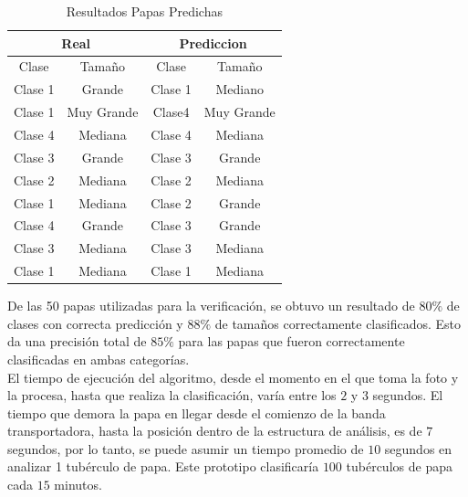 \begin{table}[ht]
	\centering
	\begin{tabular}{|cc|cc|}
		\hline
		\multicolumn{2}{|c|}{Real}                 & \multicolumn{2}{c|}{Prediccion}           \\ \hline
		\multicolumn{1}{|c|}{Clase}   & Tamaño     & \multicolumn{1}{c|}{Clase}   & Tamaño     \\ \hline
		\multicolumn{1}{|c|}{Clase 1} & Grande     & \multicolumn{1}{c|}{Clase 1} & Mediano    \\ \hline
		\multicolumn{1}{|c|}{Clase 1} & Muy Grande & \multicolumn{1}{c|}{Clase4}  & Muy Grande \\ \hline
		\multicolumn{1}{|c|}{Clase 4} & Mediana    & \multicolumn{1}{c|}{Clase 4} & Mediana    \\ \hline
		\multicolumn{1}{|c|}{Clase 3} & Grande     & \multicolumn{1}{c|}{Clase 3} & Grande     \\ \hline
		\multicolumn{1}{|c|}{Clase 2} & Mediana    & \multicolumn{1}{c|}{Clase 2} & Mediana    \\ \hline
		\multicolumn{1}{|c|}{Clase 1} & Mediana    & \multicolumn{1}{c|}{Clase 2} & Grande     \\ \hline
		\multicolumn{1}{|c|}{Clase 4} & Grande     & \multicolumn{1}{c|}{Clase 3} & Grande     \\ \hline
		\multicolumn{1}{|c|}{Clase 3} & Mediana    & \multicolumn{1}{c|}{Clase 3} & Mediana    \\ \hline
		\multicolumn{1}{|c|}{Clase 1} & Mediana    & \multicolumn{1}{c|}{Clase 1} & Mediana    \\ \hline
	\end{tabular}
	\caption{Resultados Papas Predichas}
	\label{table:res}
\end{table}


De las 50 papas utilizadas para la verificación, se obtuvo un resultado de $80\%$ de clases con correcta predicción y $88\%$ de tamaños correctamente clasificados. Esto da una precisión total de $85\%$ para las papas que fueron correctamente clasificadas en ambas categorías.\\

El tiempo de ejecución del algoritmo, desde el momento en el que toma la foto y la procesa, hasta que realiza la clasificación, varía entre los $2$ y $3$ segundos. El tiempo que demora la papa en llegar desde el comienzo de la banda transportadora, hasta la posición dentro de la estructura de análisis, es de $7$ segundos, por lo tanto, se puede asumir un tiempo promedio de $10$ segundos en analizar 1 tubérculo de papa. Este prototipo clasificaría $100$ tubérculos de papa cada $15$ minutos.	 	

